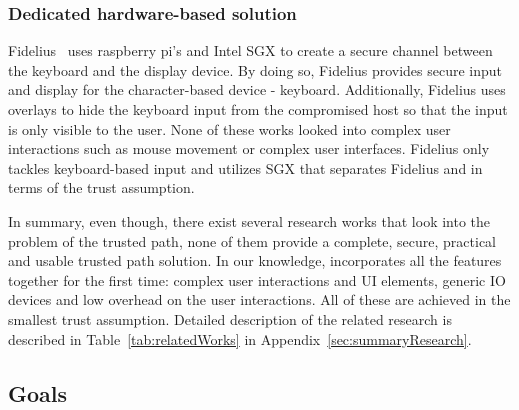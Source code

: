 \subsubsection{\bfseries Dedicated hardware-based solution}  Fidelius~\cite{Fidelius} uses raspberry pi's and Intel SGX to create a secure channel between the keyboard and the display device. By doing so, Fidelius provides secure input and display for the character-based device - keyboard. Additionally, Fidelius uses overlays to hide the keyboard input from the compromised host so that the input is only visible to the user. 
None of these works looked into complex user interactions such as mouse movement or complex user interfaces. Fidelius only tackles keyboard-based input and utilizes SGX that separates Fidelius and \name in terms of the trust assumption.  


In summary, even though, there exist several research works that look into the problem of the trusted path, none of them provide a complete, secure, practical and usable trusted path solution. In our knowledge, \name incorporates all the features together for the first time: complex user interactions and UI elements, generic IO devices and low overhead on the user interactions. All of these are achieved in the smallest trust assumption.  
Detailed description of the related research is described in Table~\ref{tab:relatedWorks} in Appendix~\ref{sec:summaryResearch}.

\subsection{Goals}
\label{sec:problemStatement:goals}

